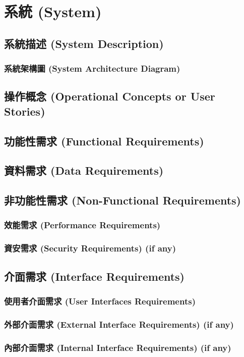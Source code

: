 \documentclass[a4paper, 12pt]{article}
\begin{document}
\newpage

\section{系統 (System)}
\subsection{系統描述 (System Description)}
\subsubsection{系統架構圖 (System Architecture Diagram) }
\subsection{操作概念 (Operational Concepts or User Stories)}
\subsection{功能性需求 (Functional Requirements)}
\subsection{資料需求 (Data Requirements)}
\subsection{非功能性需求 (Non-Functional Requirements)}
\subsubsection{效能需求 (Performance Requirements)}
\subsubsection{資安需求 (Security Requirements) (if any)}
\subsection{介面需求 (Interface Requirements)}
\subsubsection{使用者介面需求 (User Interfaces Requirements)}
\subsubsection{外部介面需求 (External Interface Requirements) (if any)}
\subsubsection{內部介面需求 (Internal Interface Requirements) (if any)}
\end{document}
